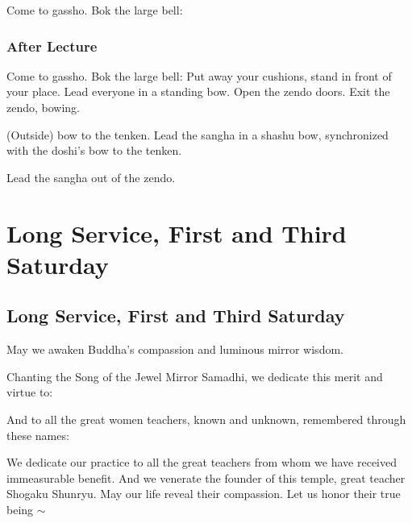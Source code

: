 \documentclass{kdo}
\begin{document}
\begin{services}
\doshi Come to gassho.
\doan Bok the large bell: \bigspace\bok
\sangha \sutraOpeningVerse*
\newpage

\section*{After Lecture}
\doshi Come to gassho.
\doan Bok the large bell: \bigspace\bok
\sangha \fourVows*
\sangha Put away your cushions, stand in front of your place.
\doshi Lead everyone in a standing bow.
\tenken Open the zendo doors.
\doshi Exit the zendo, bowing.

(Outside) bow to the tenken.
\doan Lead the sangha in a shashu bow, synchronized with the doshi's bow to
the tenken.

Lead the sangha out of the zendo.

\part{Long Service, First and Third Saturday}
\chapter{Long Service, First and Third Saturday}
\begin{service}
\kokyo \makaHannyaHaramittaShingyo
\pagebreak
\kokyo \enmeiJukkuKannonGyo
\kokyo {}
\sangha \allBuddhas*
\kokyo \songOfTheJewelMirrorSamadhi
\kokyo May we awaken Buddha's compassion and luminous mirror wisdom.

Chanting the Song of the Jewel Mirror Samadhi, we dedicate this merit and
virtue to: \bigspace\clank

\begin{outdent}
  \ancestorsShort*
\end{outdent}

\kokyo And to all the great women teachers, known and unknown, remembered
through these names: \bigspace\clank

\begin{outdent}
  \femaleAncestors*
\end{outdent}

\kokyo We dedicate our practice to all the great teachers from whom we have
received immeasurable benefit. And we venerate the founder of this temple,
great teacher Shogaku Shunryu. May our life reveal their compassion. Let us
honor their true being $\sim$ \largebell
\end{service}


\end{services}
\end{document}
